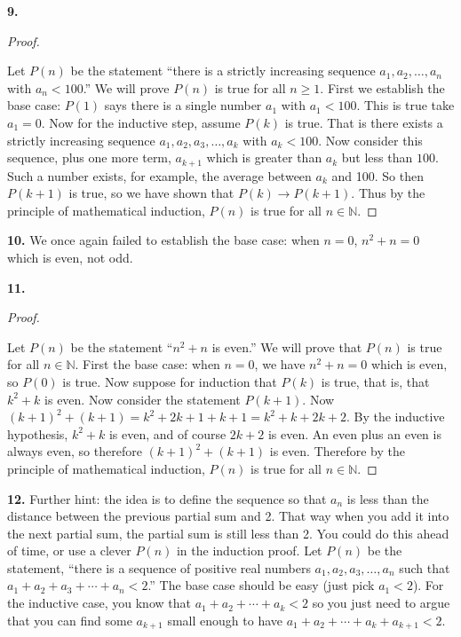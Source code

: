 \documentclass[10pt,]{book}
\theoremstyle{plain}
\theoremstyle{definition}
\theoremstyle{definition}
\theoremstyle{definition}
\numberwithin{equation}{chapter}
\def\N{\mathbb N}
\def\imp{\rightarrow}
\newcommand{\lt}{ < }
\begin{document}
%
\par\smallskip
\noindent\textbf{9.}\quad{}\begin{proof}\hypertarget{proof-27}{}

Let \(P(n)\) be the statement ``there is a strictly increasing sequence \(a_1, a_2, \ldots, a_n\) with \(a_n \lt  100\).'' We will prove \(P(n)\) is true for all \(n \ge 1\). First we establish the base case: \(P(1)\) says there is a single number \(a_1\) with \(a_1 \lt  100\). This is true \textendash{} take \(a_1 = 0\). Now for the inductive step, assume \(P(k)\) is true. That is there exists a strictly increasing sequence \(a_1, a_2, a_3, \ldots, a_k\) with \(a_k \lt  100\). Now consider this sequence, plus one more term, \(a_{k+1}\) which is greater than \(a_k\) but less than \(100\). Such a number exists, for example, the average between \(a_k\) and 100. So then \(P(k+1)\) is true, so we have shown that \(P(k) \imp P(k+1)\). Thus by the principle of mathematical induction, \(P(n)\) is true for all \(n \in \N\).
%
\end{proof}
\par\smallskip
\noindent\textbf{10.}\quad{}
We once again failed to establish the base case: when \(n = 0\), \(n^2 + n = 0\) which is even, not odd.
%
\par\smallskip
\noindent\textbf{11.}\quad{}\begin{proof}\hypertarget{proof-29}{}

Let \(P(n)\) be the statement ``\(n^2 + n\) is even.'' We will prove that \(P(n)\) is true for all \(n \in \N\). First the base case: when \(n = 0\), we have \(n^2 + n = 0\) which is even, so \(P(0)\) is true. Now suppose for induction that \(P(k)\) is true, that is, that \(k^2 + k\) is even. Now consider the statement \(P(k+1)\). Now \((k+1)^2 + (k+1) = k^2 + 2k + 1 + k + 1 = k^2 + k + 2k + 2\). By the inductive hypothesis, \(k^2 + k\) is even, and of course \(2k + 2\) is even. An even plus an even is always even, so therefore \((k+1)^2 + (k+1)\) is even. Therefore by the principle of mathematical induction, \(P(n)\) is true for all \(n \in \N\).
%
\end{proof}
\par\smallskip
\noindent\textbf{12.}\quad{}
Further hint: the idea is to define the sequence so that \(a_n\) is less than the distance between the previous partial sum and 2. That way when you add it into the next partial sum, the partial sum is still less than 2. You could do this ahead of time, or use a clever \(P(n)\) in the induction proof. Let \(P(n)\) be the statement, ``there is a sequence of positive real numbers \(a_1, a_2, a_3, \ldots, a_n\) such that \(a_1 + a_2 + a_3 + \cdots + a_n \lt  2\).'' The base case should be easy (just pick \(a_1 \lt  2\)). For the inductive case, you know that \(a_1 + a_2 + \cdots + a_k \lt  2\) so you just need to argue that you can find some \(a_{k+1}\) small enough to have \(a_1 + a_2 + \cdots +a_k + a_{k+1} \lt  2\).
\end{document}
